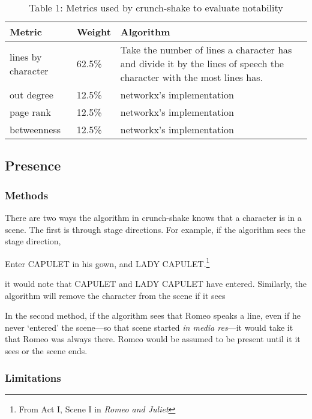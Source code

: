 \documentclass[12pt]{article}
\begin{document}
\begin{center}
    \begin{table}
    \caption*{Table 1: Metrics used by crunch-shake to evaluate
    notability}
    \centering
    \begin{tabular}{ l l p{5cm} }
        \toprule
    Metric & Weight & Algorithm \\ \midrule
        lines by character & 62.5\% & Take the number of lines a character has
        and divide it by the lines of speech the character with
        the most lines has.\\ \hline
        out degree & 12.5\% & networkx's implementation \\ \hline
        page rank & 12.5\% & networkx's implementation \\ \hline
        betweenness & 12.5\% & networkx's implementation \\
    \bottomrule
    \end{tabular}
    \end{table}
\end{center}

\subsection{Presence}
\label{sub:presence}

\subsubsection{Methods}
\label{ssub:method}


There are two ways the algorithm in crunch-shake knows that a character
is in a scene. The first is through stage directions. For example, if the
algorithm sees the stage direction,
\begin{displayquote}
Enter CAPULET in his gown, and LADY CAPULET.\footnote{From Act
    I, Scene I in \emph{Romeo and Juliet}}
\end{displayquote}
it would note that CAPULET and LADY CAPULET have entered. Similarly, the
algorithm will remove the character from the scene if it sees 

In the second method, if the algorithm sees that Romeo speaks a line, even if he never
`entered' the scene---so that scene started \textit{in media res}---it would
take it that Romeo was always there. Romeo would be assumed to be present until
it it sees  or the scene ends.

\subsubsection{Limitations}
\label{ssub:limitations}
\end{document}
